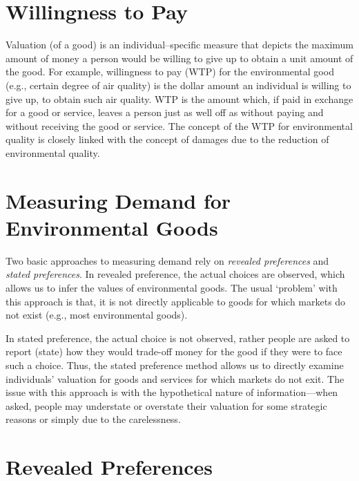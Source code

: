 \documentclass[
]{book}
\begin{document}
\hypertarget{willingness-to-pay}{%
\section{Willingness to Pay}\label{willingness-to-pay}}

Valuation (of a good) is an individual--specific measure that depicts the maximum amount of money a person would be willing to give up to obtain a unit amount of the good. For example, willingness to pay (WTP) for the environmental good (e.g., certain degree of air quality) is the dollar amount an individual is willing to give up, to obtain such air quality. WTP is the amount which, if paid in exchange for a good or service, leaves a person just as well off as without paying and without receiving the good or service. The concept of the WTP for environmental quality is closely linked with the concept of damages due to the reduction of environmental quality.

\hypertarget{measuring-demand-for-environmental-goods}{%
\section{Measuring Demand for Environmental Goods}\label{measuring-demand-for-environmental-goods}}

Two basic approaches to measuring demand rely on \emph{revealed preferences} and \emph{stated preferences}. In revealed preference, the actual choices are observed, which allows us to infer the values of environmental goods. The usual `problem' with this approach is that, it is not directly applicable to goods for which markets do not exist (e.g., most environmental goods).

In stated preference, the actual choice is not observed, rather people are asked to report (state) how they would trade-off money for the good if they were to face such a choice. Thus, the stated preference method allows us to directly examine individuals' valuation for goods and services for which markets do not exit. The issue with this approach is with the hypothetical nature of information---when asked, people may understate or overstate their valuation for some strategic reasons or simply due to the carelessness.

\hypertarget{revealed-preferences}{%
\section{Revealed Preferences}\label{revealed-preferences}}
\end{document}
